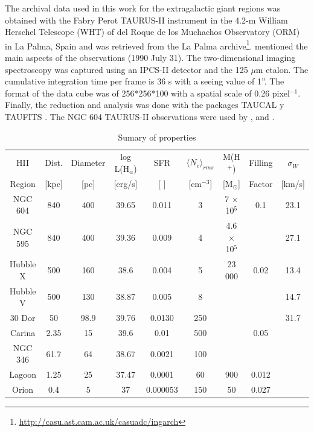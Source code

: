 \documentclass[fleqn,usenatbib, useAMS, a4paper]{mnras}
\begin{document}
The archival data used in this work for the extragalactic giant regions was obtained with the Fabry Perot TAURUS-II instrument in the 4.2-m William Herschel Telescope (WHT) of del Roque de los Muchachos Observatory (ORM) in La Palma, Spain and was retrieved from the La Palma archive\footnote{\url{http://casu.ast.cam.ac.uk/casuadc/ingarch}}.
\citet{sabalisck1995supersonic} mentioned the main aspects of the observations (1990 July 31).
The two-dimensional imaging spectroscopy was captured using an IPCS-II detector and the 125 $\mu$m etalon.
The cumulative integration time per frame is 36 s with a seeing value of 1''.
The format of the data cube was of 256*256*100 with a spatial scale of 0.26 pixel$^{-1}$.
Finally, the reduction and analysis was done with the packages TAUCAL y TAUFITS \citep{1992ASPC...25..445L}.
The NGC 604 TAURUS-II observations were used by \citet{sabalisck1995supersonic}, \citet{tanco1997} and \citet{2019arXiv191203543M}.


\begin{table}
\begin{center}\caption{Sumary of properties \citep{1984ApJ...287..116K} \citep{1986ApJ...300..624R}}
\begin{tabular}{ccccccccc}\hline
HII    &  Dist.  & Diameter & log L(H$_{\alpha}$) & SFR      &  $ \langle N_{e} \rangle_{rms}$    & M(H$^{+}$) & Filling & \(\sigma_{W}\) \\
Region     &  [kpc] &  [pc]     &  [erg/s]            & [ ]      & [cm$^{-3}$] & [M$_{\odot}$] & Factor & [km/s] \\ \hline
NGC 604   &   840  & 400     &    39.65     & 0.011    & 3  & 7 $\times$ 10$^{5}$ & 0.1 & 23.1 \\
NGC 595   &   840  & 400     &    39.36     & 0.009    & 4  & 4.6 $\times$ 10$^{5}$ & & 27.1 \\
Hubble X  &   500  & 160     &    38.6      &  0.004   &  5 & 23 000& 0.02 & 13.4 \\
Hubble V  &   500  & 130     &    38.87     &  0.005   &  8 &    & & 14.7 \\
30 Dor    &   50   & 98.9    &    39.76     & 0.0130   & 250&    & & 31.7 \\
Carina    &   2.35 & 15      &    39.6      & 0.01     & 500&    & 0.05 & \\
NGC 346   &   61.7 & 64      &    38.67     & 0.0021   & 100&    &     & \\
Lagoon    &   1.25 & 25      &    37.47     & 0.0001   &  60& 900& 0.012 & \\
Orion     &   0.4  & 5       &    37        & 0.000053 & 150& 50 & 0.027 & \\\hline
\end{tabular}\label{tab:Reg}
\end{center}
\end{table} 
\end{document}
